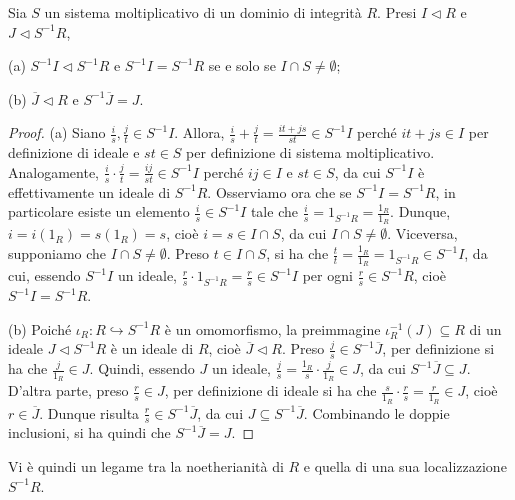 \begin{prop}[1.7.6]{}
Sia $S$ un sistema moltiplicativo di un dominio di integrità $R$. Presi $I\lhd R$ e $J\lhd S^{-1}R$,

\noindent (a) $S^{-1}I\lhd S^{-1}R$ e $S^{-1}I=S^{-1}R$ se e solo se $I\cap S\neq \emptyset$;

\noindent (b) $\overline{J}\lhd R$ e $S^{-1}\overline{J}=J$.
\end{prop}
\vspace{-4mm}
\begin{proof}
(a) Siano $\frac{i}{s},\frac{j}{t}\in S^{-1}I$. Allora, $\frac{i}{s}+\frac{j}{t}=\frac{it+js}{st}\in S^{-1}I$ perché $it+js\in I$ per definizione di ideale e $st\in S$ per definizione di sistema moltiplicativo. Analogamente, $\frac{i}{s}\cdot \frac{j}{t}=\frac{ij}{st}\in S^{-1}I$ perché $ij\in I$ e $st\in S$, da cui $S^{-1}I$ è effettivamente un ideale di $S^{-1}R$. Osserviamo ora che se $S^{-1}I=S^{-1}R$, in particolare esiste un elemento $\frac{i}{s}\in S^{-1}I$ tale che $\frac{i}{s}=1_{S^{-1}R}=\frac{1_R}{1_R}$. Dunque, $i=i(1_R)=s(1_R)=s$, cioè $i=s\in I\cap S$, da cui $I\cap S\neq \emptyset$. Viceversa, supponiamo che $I\cap S\neq \emptyset$. Preso $t\in I\cap S$, si ha che $\frac{t}{t}=\frac{1_R}{1_R}=1_{S^{-1}R}\in S^{-1}I$, da cui, essendo $S^{-1}I$ un ideale, $\frac{r}{s}\cdot 1_{S^{-1}R}=\frac{r}{s}\in S^{-1}I$ per ogni $\frac{r}{s}\in S^{-1}R$, cioè $S^{-1}I=S^{-1}R$.

\vspace{1mm}

\noindent (b) Poiché $\iota_R\colon R\hookrightarrow S^{-1}R$ è un omomorfismo, la preimmagine $\iota_R^{-1}(J)\subseteq R$ di un ideale $J\lhd S^{-1}R$ è un ideale di $R$, cioè $\overline{J}\lhd R$. Preso $\frac{j}{s}\in S^{-1}\overline{J}$, per definizione si ha che $\frac{j}{1_R}\in J$. Quindi, essendo $J$ un ideale, $\frac{j}{s}=\frac{1_R}{s}\cdot \frac{j}{1_R}\in J$, da cui $S^{-1}\overline{J}\subseteq J$. D'altra parte, preso $\frac{r}{s}\in J$, per definizione di ideale si ha che $\frac{s}{1_R}\cdot \frac{r}{s}=\frac{r}{1_R}\in J$, cioè $r\in \overline{J}$. Dunque risulta $\frac{r}{s}\in S^{-1}\overline{J}$, da cui $J\subseteq S^{-1}\overline{J}$. Combinando le doppie inclusioni, si ha quindi che $S^{-1}\overline{J}=J$.
\end{proof}

\noindent Vi è quindi un legame tra la noetherianità di $R$ e quella di una sua localizzazione $S^{-1}R$.

